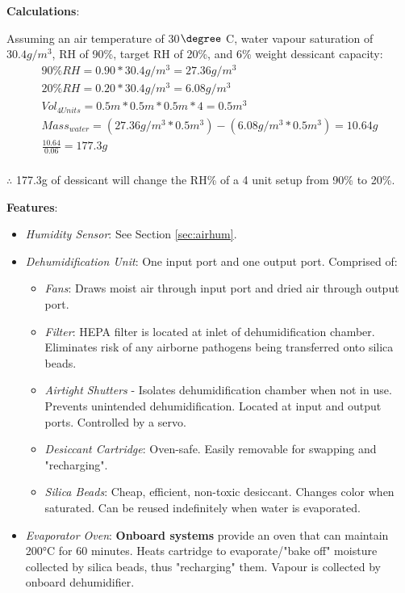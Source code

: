 \documentclass{../tex/report}
\begin{document}
\textbf{Calculations}:

Assuming an air temperature of 30$\degree$ C, water vapour saturation of $30.4g/m^{3}$, RH of 90\%, target RH of 20\%, and 6\% weight dessicant capacity:
\vspace{.05cm}
\begin{gather*}
    90\% RH = 0.90 * 30.4g/m^{3} = 27.36g/m^{3} \\
    20\% RH = 0.20 * 30.4g/m^{3} = 6.08g/m^{3} \\
    Vol_{4 Units} = 0.5m * 0.5m * 0.5m * 4 = 0.5m^{3} \\
    Mass_{water} = (27.36g/m^{3} * 0.5m^{3}) - (6.08g/m^{3} * 0.5m^{3}) = 10.64g \\
    \frac{10.64}{0.06} = 177.3g \\
\end{gather*}

$\therefore$ 177.3g of dessicant will change the RH\% of a 4 unit setup from 90\% to 20\%.


\textbf{Features}:
\begin{itemize}
    \item \textit{Humidity Sensor}: See Section \ref{sec:airhum}.
    \item \textit{Dehumidification Unit}: One input port and one output port. Comprised of:
    \begin{itemize}
        \item \textit{Fans}: Draws moist air through input port and dried air through output port.
        \item \textit{Filter}: HEPA filter is located at inlet of dehumidification chamber. Eliminates risk of any airborne pathogens being transferred onto silica beads.
        \item \textit{Airtight Shutters} - Isolates dehumidification chamber when not in use. Prevents unintended dehumidification. Located at input and output ports. Controlled by a servo.
        \item \textit{Desiccant Cartridge}: Oven-safe. Easily removable for swapping and "recharging".
        \item \textit{Silica Beads}: Cheap, efficient, non-toxic desiccant. Changes color when saturated. Can be reused indefinitely when water is evaporated.
    \end{itemize}
    \item \textit{Evaporator Oven}: \textbf{Onboard systems} provide an oven that can maintain 200°C for 60 minutes. Heats cartridge to evaporate/"bake off" moisture collected by silica beads, thus "recharging" them. Vapour is collected by onboard dehumidifier.
\end{itemize}
\end{document}
